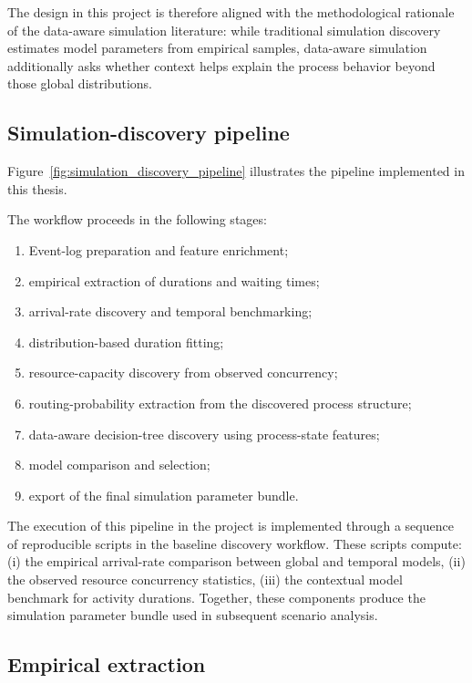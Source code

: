 The design in this project is therefore aligned with the methodological rationale of the data-aware simulation literature:
while traditional simulation discovery estimates model parameters from empirical samples, data-aware simulation additionally asks whether context helps explain the process behavior beyond those global distributions.

\subsection{Simulation-discovery pipeline}

Figure~\ref{fig:simulation_discovery_pipeline} illustrates the pipeline implemented in this thesis.

The workflow proceeds in the following stages:

\begin{enumerate}
    \item Event-log preparation and feature enrichment;
    \item empirical extraction of durations and waiting times;
    \item arrival-rate discovery and temporal benchmarking;
    \item distribution-based duration fitting;
    \item resource-capacity discovery from observed concurrency;
    \item routing-probability extraction from the discovered process structure;
    \item data-aware decision-tree discovery using process-state features;
    \item model comparison and selection;
    \item export of the final simulation parameter bundle.
\end{enumerate}

The execution of this pipeline in the project is implemented through a sequence of reproducible scripts in the baseline discovery workflow.
These scripts compute:
(i) the empirical arrival-rate comparison between global and temporal models,
(ii) the observed resource concurrency statistics,
(iii) the contextual model benchmark for activity durations.
Together, these components produce the simulation parameter bundle used in subsequent scenario analysis.

\subsection{Empirical extraction}

